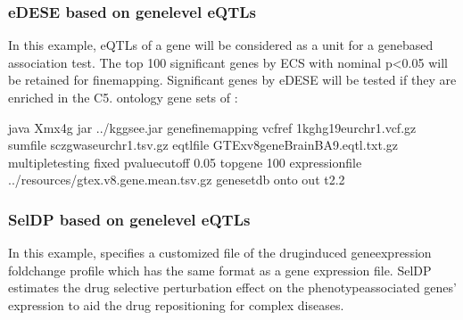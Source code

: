 \documentclass[letterpaper,10pt,english,openany,oneside]{sphinxmanual}
\begin{document}
\subsubsection{eDESE based on gene\sphinxhyphen{}level eQTLs}
\label{\detokenize{detailed_document:edese-based-on-gene-level-eqtls}}
\sphinxAtStartPar
In this example, eQTLs of a gene will be considered as a unit for a gene\sphinxhyphen{}based association test. The top 100 significant genes by ECS with nominal p\textless{}0.05 will be retained for fine\sphinxhyphen{}mapping. Significant genes by eDESE will be tested if they are enriched in the C5. ontology gene sets of :

\begin{sphinxVerbatim}[commandchars=\\\{\}]
java \PYGZhy{}Xmx4g \PYGZhy{}jar ../kggsee.jar 
  \PYGZhy{}\PYGZhy{}gene\PYGZhy{}finemapping 
  \PYGZhy{}\PYGZhy{}vcf\PYGZhy{}ref 1kg\PYGZus{}hg19\PYGZus{}eur\PYGZus{}chr1.vcf.gz 
  \PYGZhy{}\PYGZhy{}sum\PYGZhy{}file scz\PYGZus{}gwas\PYGZus{}eur\PYGZus{}chr1.tsv.gz 
  \PYGZhy{}\PYGZhy{}eqtl\PYGZhy{}file GTEx\PYGZus{}v8\PYGZus{}gene\PYGZus{}BrainBA9.eqtl.txt.gz 
  \PYGZhy{}\PYGZhy{}multiple\PYGZhy{}testing fixed 
  \PYGZhy{}\PYGZhy{}p\PYGZhy{}value\PYGZhy{}cutoff 0.05 
  \PYGZhy{}\PYGZhy{}top\PYGZhy{}gene 100 
  \PYGZhy{}\PYGZhy{}expression\PYGZhy{}file ../resources/gtex.v8.gene.mean.tsv.gz 
  \PYGZhy{}\PYGZhy{}geneset\PYGZhy{}db onto 
  \PYGZhy{}\PYGZhy{}out t2.2
\end{sphinxVerbatim}


\subsubsection{SelDP based on gene\sphinxhyphen{}level eQTLs}
\label{\detokenize{detailed_document:seldp-based-on-gene-level-eqtls}}
\sphinxAtStartPar
In this example,  specifies a customized file of the drug\sphinxhyphen{}induced gene\sphinxhyphen{}expression fold\sphinxhyphen{}change profile which has the same format as a gene expression file. SelDP estimates the drug selective perturbation effect on the phenotype\sphinxhyphen{}associated genes’ expression to aid the drug repositioning for complex diseases.
\end{document}
